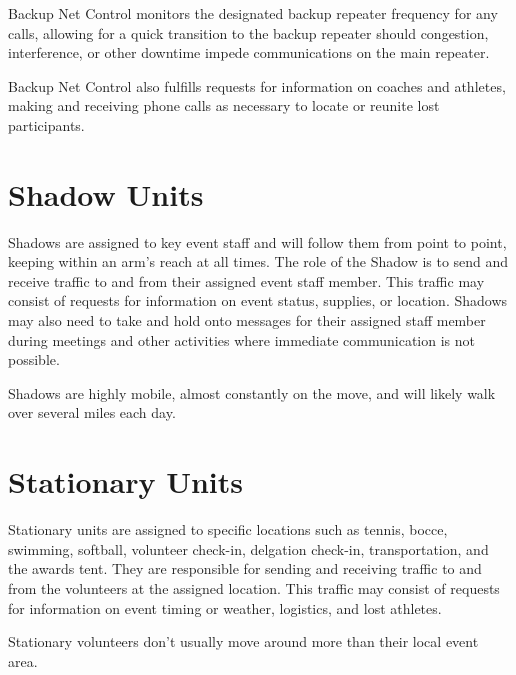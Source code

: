 \documentclass[pdflatex,letterpaper,twoside,12pt]{book}
\begin{document}
Backup Net Control monitors the designated backup repeater frequency for any calls, allowing for a quick transition to the backup repeater should congestion, interference, or other downtime impede communications on the main repeater.

Backup Net Control also fulfills requests for information on coaches and athletes, making and receiving phone calls as necessary to locate or reunite lost participants.


\section{Shadow Units}

Shadows are assigned to key event staff and will follow them from point to point, keeping within an arm's reach at all times.  The role of the Shadow is to send and receive traffic to and from their assigned event staff member.  This traffic may consist of requests for information on event status, supplies, or location.  Shadows may also need to take and hold onto messages for their assigned staff member during meetings and other activities where immediate communication is not possible.

Shadows are highly mobile, almost constantly on the move, and will likely walk over several miles each day.


\section{Stationary Units}

Stationary units are assigned to specific locations such as tennis, bocce, swimming, softball, volunteer check-in, delgation check-in, transportation, and the awards tent.  They are responsible for sending and receiving traffic to and from the volunteers at the assigned location.  This traffic may consist of requests for information on event timing or weather, logistics, and lost athletes.

Stationary volunteers don't usually move around more than their local event area.

\end{document}
